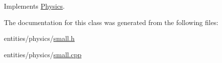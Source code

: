 Implements \hyperlink{class_physics_a00580cf655d0569cc44f11b630cfcee7}{Physics}.



The documentation for this class was generated from the following files\-:\begin{DoxyCompactItemize}
\item 
entities/physics/\hyperlink{small_8h}{small.\-h}\item 
entities/physics/\hyperlink{small_8cpp}{small.\-cpp}\end{DoxyCompactItemize}
